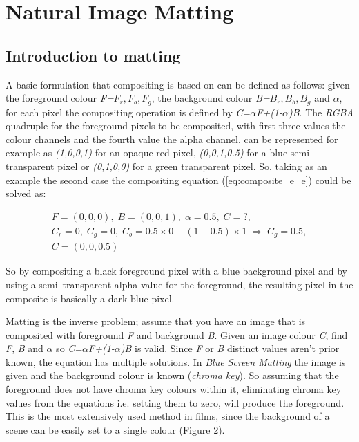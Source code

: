 \chapter{Natural Image Matting }
\label{chap:natural-image-matting}

\section{Introduction to matting}
\label{sec:introduction-to-matting}

A basic formulation that compositing is based on \cite{compositing} can be defined as follows: given the foreground colour \textit{F=\(F_r,F_b,F_g\)}, the background colour \textit{B=\(B_r,B_b,B_g\)} and $\alpha$, for each pixel the compositing operation is defined by \textit{C=$\alpha$F+(1-$\alpha$)B}. The \textit{RGBA} quadruple for the foreground pixels to be composited, with first three values the colour channels and the fourth value the alpha channel, can be represented for example as \textit{(1,0,0,1)} for an opaque red pixel, \textit{(0,0,1,0.5)} for a blue semi-transparent pixel or \textit{(0,1,0,0)} for a green transparent pixel. So, taking as an example the second case the compositing equation (\ref{eq:composite_e_e}) could be solved as:

\begin{equation} \label{eq:composite_e_e}
\begin{split}
F=(0,0,0),\;B=(0,0,1),\;\alpha=0.5,\;C=?,\\
C_r=0,\;C_g=0,\;C_b=0.5 \times 0+(1-0.5) \times 1\;
\Rightarrow\;C_g=0.5,\\
C=(0,0,0.5)
\end{split}
\end{equation}

So by compositing a black foreground pixel with a blue background pixel and by using a semi–transparent alpha value for the foreground, the resulting pixel in the composite is basically a dark blue pixel.
\par
Matting is the inverse problem; assume that you have an image that is composited with foreground \textit{F} and background \textit{B}. Given an image colour \textit{C}, find \textit{F}, \textit{B} and \textit{$\alpha$} so \textit{C=$\alpha$F+(1-$\alpha$)B} is valid. Since \textit{F} or \textit{B} distinct values aren’t prior known, the equation has multiple solutions. In \textit{Blue Screen Matting} \cite{blue} the image is given and the background colour is known (\textit{chroma key}). So assuming that the foreground does not have chroma key colours within it, eliminating chroma key values from the equations i.e. setting them to zero, will produce the foreground. This is the most extensively used method in films, since the background of a scene can be easily set to a single colour (Figure 2).

